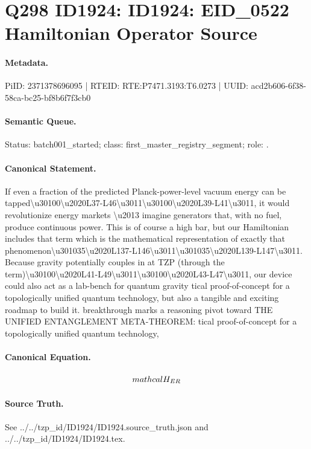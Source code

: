 \section*{Q298 ID1924: ID1924: EID\_0522 Hamiltonian Operator Source}
\paragraph{Metadata.}
PiID: 2371378696095 | RTEID: RTE:P7471.3193:T6.0273 | UUID: acd2b606-6f38-58ca-bc25-bf8b6f7f3cb0

\paragraph{Semantic Queue.}
Status: batch001\_started; class: first\_master\_registry\_segment; role: .

\paragraph{Canonical Statement.}
If even a fraction of the predicted Planck-power-level vacuum energy can be tapped\textbackslash{}u30100\textbackslash{}u2020L37-L46\textbackslash{}u3011\textbackslash{}u30100\textbackslash{}u2020L39-L41\textbackslash{}u3011, it would revolutionize energy markets \textbackslash{}u2013 imagine generators that, with no fuel, produce continuous power. This is of course a high bar, but our Hamiltonian includes that term which is the mathematical representation of exactly that phenomenon\textbackslash{}u301035\textbackslash{}u2020L137-L146\textbackslash{}u3011\textbackslash{}u301035\textbackslash{}u2020L139-L147\textbackslash{}u3011. Because gravity potentially couples in at TZP (through the term)\textbackslash{}u30100\textbackslash{}u2020L41-L49\textbackslash{}u3011\textbackslash{}u30100\textbackslash{}u2020L43-L47\textbackslash{}u3011, our device could also act as a lab-bench for quantum gravity tical proof-of-concept for a topologically unified quantum technology, but also a tangible and exciting roadmap to build it. breakthrough marks a reasoning pivot toward THE UNIFIED ENTANGLEMENT META-THEOREM: tical proof-of-concept for a topologically unified quantum technology,

\paragraph{Canonical Equation.}
\[
\\mathcal{H}_{ER}
\]

\paragraph{Source Truth.}
See ../../tzp\_id/ID1924/ID1924.source\_truth.json and ../../tzp\_id/ID1924/ID1924.tex.
